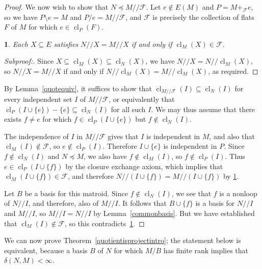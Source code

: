 \documentclass{amsart}
\theoremstyle{plain}
\newtheorem{claim}{}[theorem]
\theoremstyle{definition}
\newcommand{\cF}{\mathcal{F}}
\newcommand{\dcon}{/ \!\! /}
\DeclareMathOperator{\cl}{cl}
\newcommand{\del}{\!\setminus\!}
\newcommand{\con}{/}
\renewcommand{\ss}{\subseteq}
\newenvironment{subproof}[1][\proofname]{%
  \renewcommand{\qedsymbol}{$\blacksquare$}%
  \begin{proof}[Subproof:]%
}{%
  \end{proof}%
}
\begin{document}
\begin{proof}
  We now wish to show that $N \preceq M \dcon \cF$. Let $e \notin E(M)$ and $P = M +_{\cF} e$, 
  so we have $P \del e = M$ and $P \con e = M \dcon \cF$, and $\cF$ is precisely the collection
  of flats $F$ of $M$ for which $e \in \cl_P(F)$. 

  \begin{claim}\label{consame}
    Each $X \ss E$ satisfies $N \dcon X = M \dcon X$ if and only if $\cl_M(X) \in \cF$. 
  \end{claim}
  \begin{subproof}
    Since $X \ss \cl_M(X) \ss \cl_N(X)$, we have $N \dcon X = N \dcon \cl_M(X)$, 
    so $N \dcon X = M \dcon X$ if and only if $N \dcon \cl_M(X) = M \dcon \cl_M(X)$, 
    as required. 
  \end{subproof}

  By Lemma~\ref{quotequiv}, it suffices to show that $\cl_{M \dcon \cF}(I) \ss \cl_N(I)$ for 
  every independent set $I$ of $M \dcon \cF$,
  or equivalently that $\cl_P(I \cup \{e\}) - \{e\} \ss \cl_N(I)$ for all such $I$.  
  We may thus assume that there exists $f \ne e$ 
  for which $f \in \cl_P(I \cup \{e\})$ but $f \notin \cl_N(I)$. 
  
  The independence of $I$ in $M \dcon \cF$ gives that $I$ is independent in $M$, 
  and also that $\cl_M(I) \notin \cF$, so $e \notin \cl_P(I)$. 
  Therefore $I \cup \{e\}$ is independent in $P$. Since $f \notin \cl_N(I)$ 
  and $N \preceq M$, we also have $f \notin \cl_M(I)$, so $f \notin \cl_P(I)$.  
  Thus $e \in \cl_P(I \cup \{f\})$ by the closure exchange axiom,
  which implies that $\cl_M(I \cup \{f\}) \in \cF$, 
  and therefore $N \dcon (I \cup \{f\}) = M \dcon (I \cup \{f\})$ by \ref{consame}.

  Let $B$ be a basis for this matroid. 
  Since $f \notin \cl_N(I)$, we see that $f$ is a nonloop of $N \dcon I$, and therefore, also of $M \dcon I$. 
  It follows that $B \cup \{f\}$ is a basis for $N \dcon I$ and $M \dcon I$, so $M \dcon I = N \dcon I$ by Lemma~\ref{commonbasis}. 
  But we have established that $\cl_M(I) \notin \cF$, so this contradicts~\ref{consame}. 
\end{proof}

We can now prove Theorem~\ref{quotientisprojectintro}; the statement below 
is equivalent, because a basis $B$ of $N$ for which $M \con B$ has finite rank 
implies that $\delta(N,M) < \infty$. 
\end{document}
